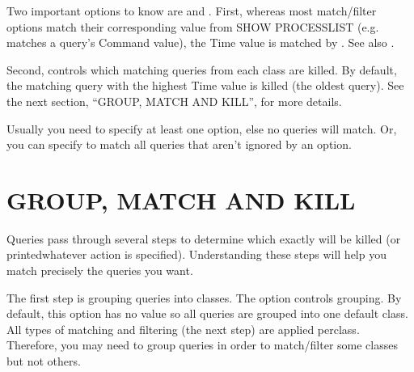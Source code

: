 \documentclass[letterpaper,10pt,english]{sphinxmanual}
\begin{document}
Two important options to know are {\hyperref[\detokenize{mariadb-kill:cmdoption-mariadb-kill-busy-time}]{}} and {\hyperref[\detokenize{mariadb-kill:cmdoption-mariadb-kill-victims}]{}}.
First, whereas most match/filter options match their corresponding value from
SHOW PROCESSLIST (e.g. {\hyperref[\detokenize{mariadb-kill:cmdoption-mariadb-kill-match-command}]{}} matches a query’s Command value),
the Time value is matched by {\hyperref[\detokenize{mariadb-kill:cmdoption-mariadb-kill-busy-time}]{}}.  See also {\hyperref[\detokenize{mariadb-kill:cmdoption-mariadb-kill-interval}]{}}.

Second, {\hyperref[\detokenize{mariadb-kill:cmdoption-mariadb-kill-victims}]{}} controls which matching queries from each class are
killed.  By default, the matching query with the highest Time value is killed
(the oldest query).  See the next section, “GROUP, MATCH AND KILL”,
for more details.

Usually you need to specify at least one  option, else no
queries will match.  Or, you can specify {\hyperref[\detokenize{mariadb-kill:cmdoption-mariadb-kill-match-all}]{}} to match all queries
that aren’t ignored by an  option.


\section{GROUP, MATCH AND KILL}
\label{\detokenize{mariadb-kill:group-match-and-kill}}
Queries pass through several steps to determine which exactly will be killed
(or printed\textendash{}whatever action is specified).  Understanding these steps will
help you match precisely the queries you want.

The first step is grouping queries into classes.  The {\hyperref[\detokenize{mariadb-kill:cmdoption-mariadb-kill-group-by}]{}} option
controls grouping.  By default, this option has no value so all queries are
grouped into one default class.  All types of matching and filtering
(the next step) are applied per\sphinxhyphen{}class.  Therefore, you may need to group
queries in order to match/filter some classes but not others.
\end{document}
